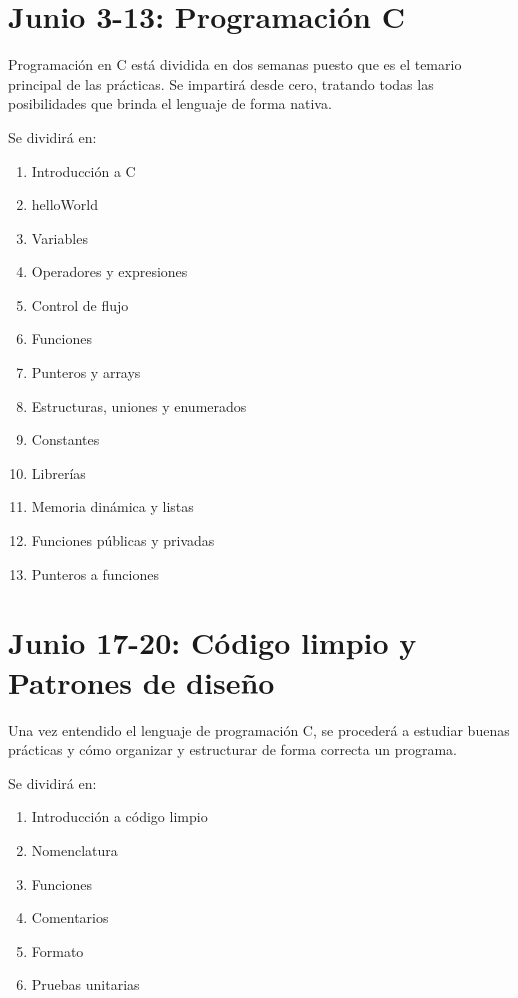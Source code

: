 \section*{Junio 3-13: Programación C}
\label{sec:jun3-13}

Programación en C está dividida en dos semanas puesto que es el temario principal de las prácticas.
Se impartirá desde cero, tratando todas las posibilidades que brinda el lenguaje de forma nativa.

Se dividirá en:

\begin{enumerate}
    \item Introducción a C
    \item helloWorld
    \item Variables
    \item Operadores y expresiones
    \item Control de flujo
    \item Funciones
    \item Punteros y arrays
    \item Estructuras, uniones y enumerados
    \item Constantes
    \item Librerías
    \item Memoria dinámica y listas
    \item Funciones públicas y privadas
    \item Punteros a funciones
\end{enumerate}

\section*{Junio 17-20: Código limpio y Patrones de diseño}
\label{sec:jun17-20}

Una vez entendido el lenguaje de programación C, se procederá a estudiar buenas prácticas y cómo organizar y estructurar de forma correcta un programa.

Se dividirá en:

\begin{enumerate}
    \item Introducción a código limpio
    \item Nomenclatura
    \item Funciones
    \item Comentarios
    \item Formato
    \item Pruebas unitarias
\end{enumerate}

